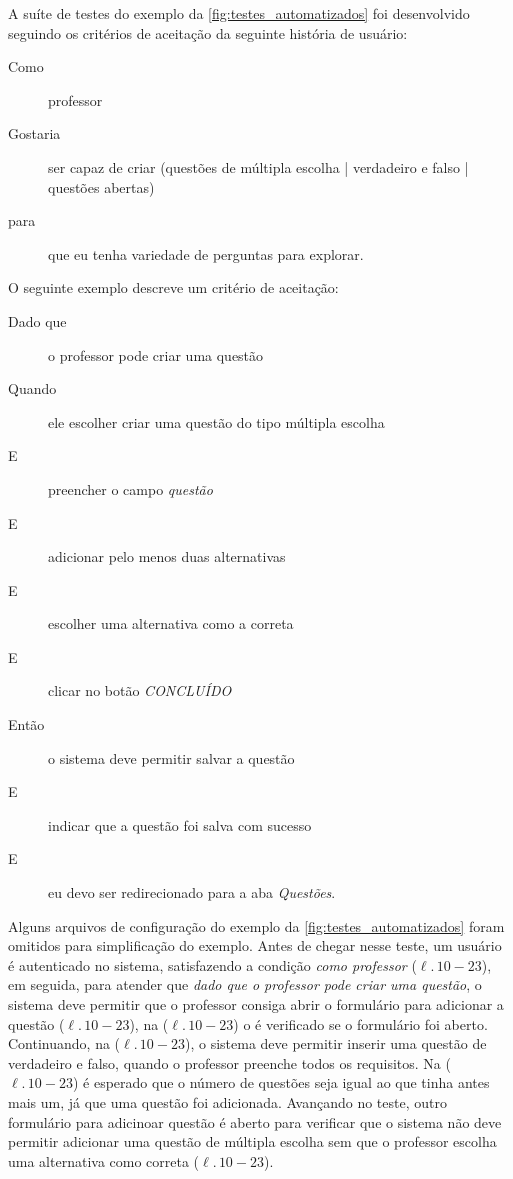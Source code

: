 A suíte de testes do exemplo da \autoref{fig:testes_automatizados} foi desenvolvido seguindo
os critérios de aceitação da seguinte história de usuário:
\begin{description}
  \item[Como] professor
  \item[Gostaria] ser capaz de criar (questões de múltipla escolha | verdadeiro e falso | questões abertas)
  \item[para] que eu tenha variedade de perguntas para explorar.
\end{description}
O seguinte exemplo descreve um critério de aceitação:
\begin{description}
  \item[Dado que] o professor pode criar uma questão
  \item[Quando] ele escolher criar uma questão do tipo múltipla escolha
  \item[E] preencher o campo \textit{questão}
  \item[E] adicionar pelo menos duas alternativas
  \item[E] escolher uma alternativa como a correta
  \item[E] clicar no botão \textit{CONCLUÍDO}
  \item[Então] o sistema deve permitir salvar a questão
  \item[E] indicar que a questão foi salva com sucesso
  \item[E] eu devo ser redirecionado para a aba \textit{Questões}.
\end{description}

Alguns arquivos de configuração do exemplo da \autoref{fig:testes_automatizados} foram
omitidos para simplificação do exemplo. Antes de chegar nesse teste, um usuário é autenticado
no sistema, satisfazendo a condição \textit{como professor} ($\ell.\,10-23$), em seguida,
para atender que \textit{dado que o professor pode criar uma questão}, o sistema deve permitir
que o professor consiga abrir o formulário para adicionar a questão ($\ell.\,10-23$), na ($\ell.\,10-23$)
o é verificado se o formulário foi aberto. Continuando, na ($\ell.\,10-23$), o sistema deve
permitir inserir uma questão de verdadeiro e falso, quando o professor preenche todos os requisitos.
Na ($\ell.\,10-23$) é esperado que o número de questões seja igual ao que tinha antes mais um, já que
uma questão foi adicionada. Avançando no teste, outro formulário para adicinoar questão é aberto
para verificar que o sistema não deve permitir adicionar uma questão de múltipla escolha sem que o
professor escolha uma alternativa como correta ($\ell.\,10-23$).

